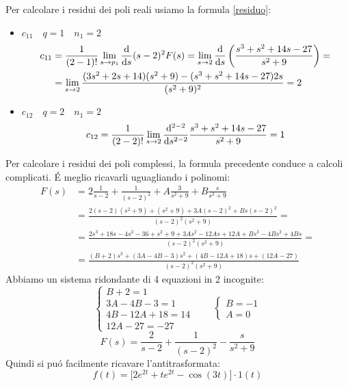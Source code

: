 \begin{mdframed}[style=Exercise]
\begin{Exercise}[title={Poli reali multipli, poli complessi semplici}, difficulty=2]
			Per calcolare i residui dei poli reali usiamo la formula \ref{residuo}:
			\begin{itemize}
				\item 
					$ c_{11} \quad q=1 \quad n_1=2 $
					\begin{align*}
						c_{11} &= \frac{1}{(2-1)!} \lim\limits_{s \rightarrow p_1} \frac{\mathrm{d} }{\mathrm{d} s} (s-2)^2 F(s) = \lim\limits_{s \rightarrow 2} \frac{\mathrm{d} }{\mathrm{d} s} \left( \frac{s^3+s^2+14s-27}{s^2+9} \right) =
						\\
						&= \lim\limits_{s \rightarrow 2} \frac{(3s^2+2s+14)(s^2+9)-(s^3+s^2+14s-27)2s}{(s^2+9)^2} = 2
					\end{align*}
				\item 
					$ c_{12} \quad q=2 \quad n_1=2 $
					\[
						c_{12} = \dfrac{1}{(2-2)!}\lim\limits_{s \rightarrow 2} \frac{\mathrm{d} ^{2-2}}{\mathrm{d} s^{2-2}} \frac{s^3+s^2+14s-27}{s^2+9} = 1
					\]
			\end{itemize}
			Per calcolare i residui dei poli complessi, la formula precedente conduce a calcoli complicati. \'{E} meglio ricavarli uguagliando i polinomi:
			\begin{align*}
				F(s) &= 2 \frac{1}{s-2} + \frac{1}{(s-2)^2} + A \frac{3}{s^2+9} + B \frac{s}{s^2+9}
				\\
				&= \frac{2(s-2)(s^2+9)+(s^2+9)+3A(s-2)^2+Bs(s-2)^2}{(s-2)^2(s^2+9)} =
				\\
				&= \frac{2s^3+18s-4s^2-36+s^2+9+3As^2-12As+12A+Bs^3-4Bs^2+4Bs}{(s-2)^2(s^2+9)} =
				\\
				&= \frac{(B+2)s^3 + (3A-4B-3)s^2 + (4B-12A+18)s + (12A-27)}{(s-2)^2(s^2+9)}
			\end{align*}
			Abbiamo un sistema ridondante di 4 equazioni in 2 incognite:
			\[ 
				\begin{cases}
					B+2=1
					\\
					3A-4B-3=1
					\\
					4B-12A+18=14
					\\
					12A-27=-27
				\end{cases}\qquad
				\begin{cases}
					B=-1
					\\
					A=0
				\end{cases}
			\]
			\[
				F(s) = \dfrac{2}{s-2} + \dfrac{1}{(s-2)^2} - \dfrac{s}{s^2+9}
			\]
			Quindi si pu\'{o} facilmente ricavare l'antitrasformata:
			\[
				f(t) = \big[ 2e^{2t} + t e^{2t} - \cos(3t) \big] \cdot 1(t)
			\]
		\end{Exercise}
	\end{mdframed}

